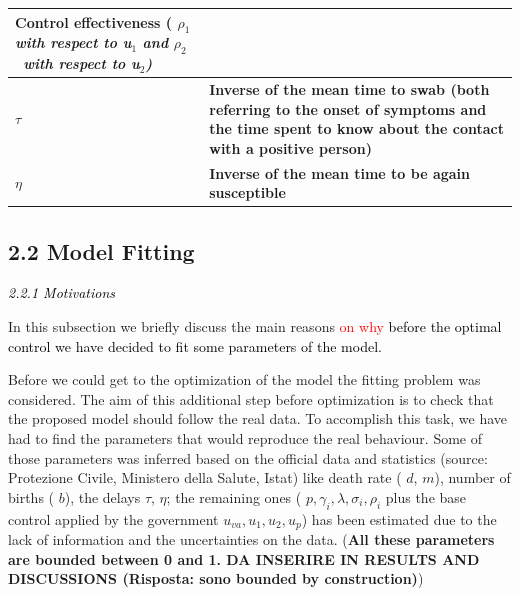 \documentclass[a4paper]{article}
\providecommand\textsubscript[1]{\ensuremath{{}_{\text{#1}}}}
\begin{document}
\begin{flushleft}
\begin{supertabular}{|m{2.391cm}m{14.209001cm}|}
\textbf{Control effectiveness (} $\rho _1$\textbf{\textit{ with respect to
u}}\textbf{\textit{\textsubscript{1}}}\textbf{\textit{ and }} $\rho _2$ \textbf{\textit{\ with respect to
u}}\textbf{\textit{\textsubscript{2}}}\textbf{\textit{)}}\\\hline
\centering  $\tau $ &
{\bfseries Inverse of the mean time to swab (both referring to the onset of symptoms and the time spent to know about
the contact with a positive person)}\\\hline
{} &
{\bfseries Inverse of the mean time to be again susceptible }\\\hline
\end{supertabular}
\end{flushleft}

\bigskip


\bigskip


\bigskip


\bigskip


\bigskip


\bigskip


\bigskip

\subsection[2.2 Model Fitting]{2.2 Model Fitting}
\hypertarget{Toc66707025}{}\textit{\textcolor{black}{2.2.1 Motivations }}

\textcolor[rgb]{0.07450981,0.078431375,0.07450981}{In this subsection we briefly discuss the main reasons
}\textcolor{red}{on why }\textcolor{black}{before the optimal control we have decided to fit some parameters of the
model. }

\textcolor[rgb]{0.07450981,0.078431375,0.07450981}{Before we could get to the optimization of the model the fitting
problem was considered. The aim of this additional step before optimization is to check that the proposed model should
follow the real data. To accomplish this task, we have had to find the parameters that would reproduce the real
behaviour. Some of those parameters was inferred based on the official data and statistics (source:
}\textcolor[rgb]{0.07450981,0.078431375,0.07450981}{Protezione Civile, Ministero della Salute, Istat) like death rate
(} $d$\textcolor[rgb]{0.07450981,0.078431375,0.07450981}{,} $m$\textcolor[rgb]{0.07450981,0.078431375,0.07450981}{),
number of births (} $b$\textcolor[rgb]{0.07450981,0.078431375,0.07450981}{), the delays } $\tau
$\textcolor[rgb]{0.07450981,0.078431375,0.07450981}{,} $\eta $\textcolor[rgb]{0.07450981,0.078431375,0.07450981}{; the
remaining ones (} $p,\gamma _i,\lambda ,\sigma _i,\rho _i$\textcolor[rgb]{0.07450981,0.078431375,0.07450981}{ plus the
base control applied by the government }
$u_{\mathit{va}},u_1,u_2,u_p$\textcolor[rgb]{0.07450981,0.078431375,0.07450981}{) has been estimated due to the lack of
information and the uncertainties on the data. (}\textbf{\textcolor[rgb]{0.07450981,0.078431375,0.07450981}{All these
parameters are bounded between 0 and 1. DA INSERIRE IN RESULTS AND DISCUSSIONS (Risposta: sono bounded by
construction)}}\textcolor[rgb]{0.07450981,0.078431375,0.07450981}{)}
\end{document}
